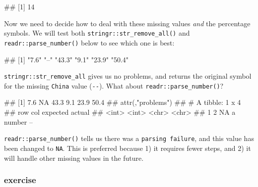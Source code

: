 \documentclass[11pt,]{article}
\newenvironment{Shaded}{\begin{snugshade}}{\end{snugshade}}
\newcommand{\AttributeTok}[1]{\textcolor[rgb]{0.77,0.63,0.00}{#1}}
\newcommand{\FunctionTok}[1]{\textcolor[rgb]{0.00,0.00,0.00}{#1}}
\newcommand{\NormalTok}[1]{#1}
\newcommand{\SpecialCharTok}[1]{\textcolor[rgb]{0.00,0.00,0.00}{#1}}
\newcommand{\StringTok}[1]{\textcolor[rgb]{0.31,0.60,0.02}{#1}}
\let\oldShaded\Shaded
\let\endoldShaded\endShaded
\renewenvironment{Shaded}{\footnotesize\oldShaded}{\endoldShaded}
\let\oldverbatim\verbatim
\let\endoldverbatim\endverbatim
\renewenvironment{verbatim}{\footnotesize\oldverbatim}{\endoldverbatim}
\begin{document}
\begin{verbatim}
## [1] 14
\end{verbatim}

Now we need to decide how to deal with these missing values \emph{and}
the percentage symbols. We will test both
\texttt{stringr::str\_remove\_all()} and \texttt{readr::parse\_number()}
below to see which one is best:

\begin{Shaded}
\end{Shaded}

\begin{verbatim}
## [1] "7.6"  "--"   "43.3" "9.1"  "23.9" "50.4"
\end{verbatim}

\texttt{stringr::str\_remove\_all} gives us no problems, and returns the
original symbol for the missing \texttt{China} value (\texttt{-\/-}).
What about \texttt{readr::parse\_number()}?

\begin{Shaded}
\end{Shaded}

\begin{verbatim}
## [1]  7.6   NA 43.3  9.1 23.9 50.4
## attr(,"problems")
## # A tibble: 1 x 4
##     row   col expected actual
##   <int> <int> <chr>    <chr> 
## 1     2    NA a number --
\end{verbatim}

\texttt{readr::parse\_number()} tells us there was a
\texttt{parsing\ failure}, and this value has been changed to
\texttt{NA}. This is preferred because 1) it requires fewer steps, and
2) it will handle other missing values in the future.

\hypertarget{exercise-5}{%
\subsubsection{exercise}\label{exercise-5}}
\end{document}
